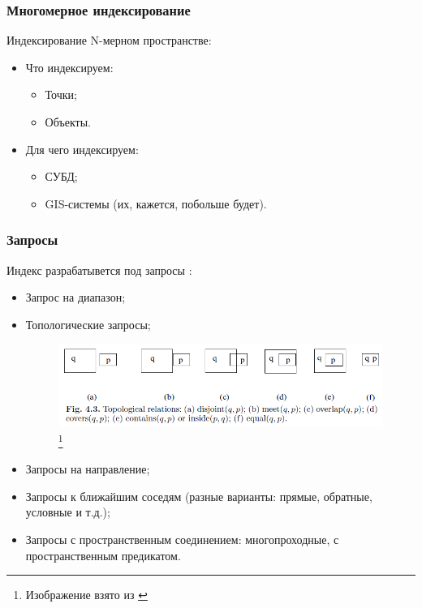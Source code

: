 \documentclass{beamer}
\begin{document}
\begin{frame}
\frametitle{Многомерное индексирование}

Индексирование N-мерном пространстве:
\begin{itemize}
  \setlength\itemsep{1em}
  \item Что индексируем:
  \begin{itemize}
    \item Точки;
    \item Объекты.
  \end{itemize}
  \item Для чего индексируем:
  \begin{itemize}
    \item СУБД;
    \item GIS-системы (их, кажется, побольше будет).
  \end{itemize}  
\end{itemize}
\end{frame}

\begin{frame}
\frametitle{Запросы}

Индекс разрабатывется под запросы \cite{Manolopoulos2005}:
\begin{itemize}
	\item Запрос на диапазон;
	\item Топологические запросы;
	\begin{figure}[htb]
		\includegraphics[width=\textwidth,height=0.3\textheight,keepaspectratio]{top-rels.png} 
		\footnote{\tiny{Изображение взято из \cite{Manolopoulos2005}}}
	\end{figure}      
	\item Запросы на направление;
	\item Запросы к ближайшим соседям (разные варианты: прямые, обратные, условные и т.д.);
	\item Запросы с пространственным соединением: многопроходные, с пространственным предикатом.
\end{itemize}
\end{frame}
\end{document}
